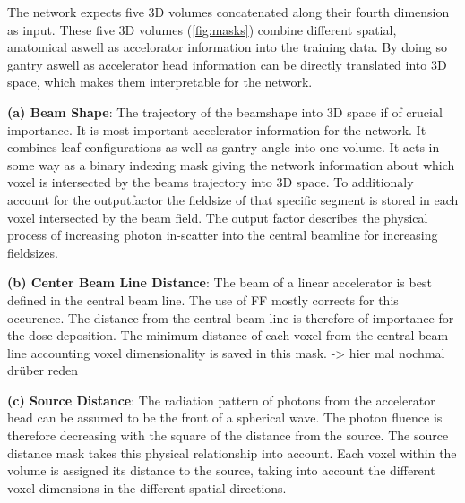 The network expects five 3D volumes concatenated along their fourth dimension as input. 
These five 3D volumes (\autoref{fig:masks}) combine different spatial, anatomical aswell as accelorator information into the training data. 
By doing so gantry aswell as accelerator head information can be directly translated into 3D space, which makes them interpretable for the network. 

\setlength{\hangingindent}{1em}

\begin{hangingpar}
    \item \textbf{(a) Beam Shape}: The trajectory of the beamshape into 3D space if of crucial importance. 
    It is most important accelerator information for the network. 
    It combines leaf configurations as well as gantry angle into one volume. 
    It acts in some way as a binary indexing mask giving the network information about which voxel is intersected by the beams trajectory into 3D space. 
    To additionaly account for the outputfactor the fieldsize of that specific segment is stored in each voxel intersected by the beam field. 
    The output factor describes the physical process of increasing photon in-scatter into the central beamline for increasing fieldsizes. 
\end{hangingpar}

\begin{hangingpar}
    \item \textbf{(b) Center Beam Line Distance}: The beam of a linear accelerator is best defined in the central beam line. The use of \ac{FF} mostly corrects for this occurence. The distance from the central beam line is therefore of importance for the dose deposition. The minimum distance of each voxel from the central beam line accounting voxel dimensionality is saved in this mask. -> hier mal nochmal drüber reden
\end{hangingpar}

\begin{hangingpar}
    \item \textbf{(c) Source Distance}: 
    The radiation pattern of photons from the accelerator head can be assumed to be the front of a spherical wave. 
    The photon fluence is therefore decreasing with the square of the distance from the source. 
    The source distance mask takes this physical relationship into account. 
    Each voxel within the volume is assigned its distance to the source, taking into account the different voxel dimensions in the different spatial directions. 
    
\end{hangingpar}

